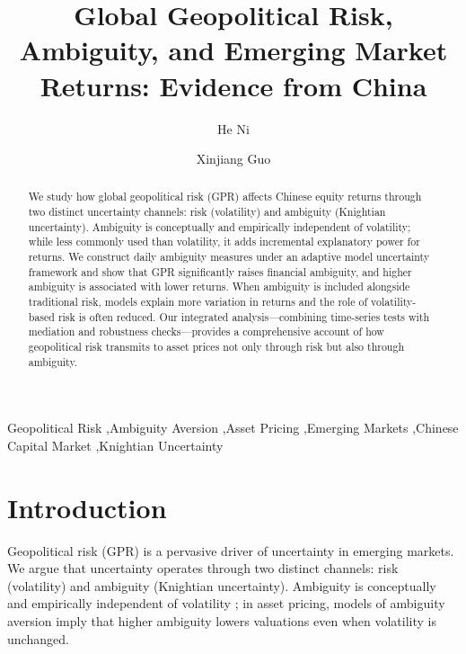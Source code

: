 \documentclass[preprint,12pt,authoryear]{elsarticle}
\begin{document}
\begin{frontmatter}

\title{Global Geopolitical Risk, Ambiguity, and Emerging Market Returns: Evidence from China}

\author[inst1]{He Ni}

\author[inst2]{Xinjiang Guo}

\begin{abstract}
We study how global geopolitical risk (GPR) affects Chinese equity returns through two distinct uncertainty channels: risk (volatility) and ambiguity (Knightian uncertainty). Ambiguity is conceptually and empirically independent of volatility; while less commonly used than volatility, it adds incremental explanatory power for returns. We construct daily ambiguity measures under an adaptive model uncertainty framework and show that GPR significantly raises financial ambiguity, and higher ambiguity is associated with lower returns. When ambiguity is included alongside traditional risk, models explain more variation in returns and the role of volatility-based risk is often reduced. Our integrated analysis—combining time-series tests with mediation and robustness checks—provides a comprehensive account of how geopolitical risk transmits to asset prices not only through risk but also through ambiguity.
\end{abstract}

\begin{keyword}
Geopolitical Risk \sep Ambiguity Aversion \sep Asset Pricing \sep Emerging Markets \sep Chinese Capital Market \sep Knightian Uncertainty
\end{keyword}

\end{frontmatter}

\section{Introduction}

Geopolitical risk (GPR) is a pervasive driver of uncertainty in emerging markets. We argue that uncertainty operates through two distinct channels: risk (volatility) and ambiguity (Knightian uncertainty). Ambiguity is conceptually and empirically independent of volatility \citep{Knight1921, Ellsberg1961}; in asset pricing, models of ambiguity aversion \citep{Gilboa1989, Klibanoff2005} imply that higher ambiguity lowers valuations even when volatility is unchanged.
\end{document}
